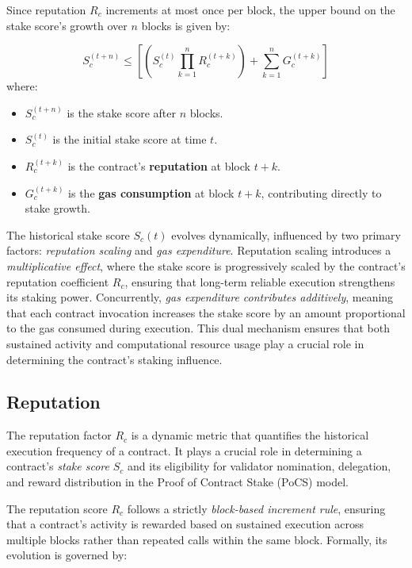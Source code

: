 \documentclass{article}
\begin{document}
Since reputation \( R_c \) increments at most once per block, the upper bound on the stake score’s growth over \( n \) blocks is given by:

\begin{equation}
S_c^{(t+n)}  \leq \left[ \left( S_c^{(t)} \prod_{k=1}^{n} R_c^{(t+k)} \right) + \sum_{k=1}^{n} G_c^{(t+k)} \right]
\end{equation} 
where:
\begin{itemize}
    \item \( S_c^{(t+n)} \) is the stake score after \( n \) blocks.
    \item \( S_c^{(t)} \) is the initial stake score at time \( t \).
    \item \( R_c^{(t+k)} \) is the contract's \textbf{reputation} at block \( t+k \).
    \item \( G_c^{(t+k)} \) is the \textbf{gas consumption} at block \( t+k \), contributing directly to stake growth.
\end{itemize}
        
The historical stake score \( S_c(t) \) evolves dynamically, influenced by two primary factors: \textit{reputation scaling} and \textit{gas expenditure}. Reputation scaling introduces a \textit{multiplicative effect}, where the stake score is progressively scaled by the contract's reputation coefficient \( R_c \), ensuring that long-term reliable execution strengthens its staking power. Concurrently, \textit{gas expenditure contributes additively}, meaning that each contract invocation increases the stake score by an amount proportional to the gas consumed during execution. This dual mechanism ensures that both sustained activity and computational resource usage play a crucial role in determining the contract’s staking influence.

\subsection{Reputation}

The reputation factor \( R_c \) is a dynamic metric that quantifies the historical execution frequency of a contract. It plays a crucial role in determining a contract’s \textit{stake score} \( S_c \) and its eligibility for validator nomination, delegation, and reward distribution in the Proof of Contract Stake (PoCS) model.

The reputation score \( R_c \) follows a strictly \textit{block-based increment rule}, ensuring that a contract's activity is rewarded based on sustained execution across multiple blocks rather than repeated calls within the same block. Formally, its evolution is governed by:
\end{document}
